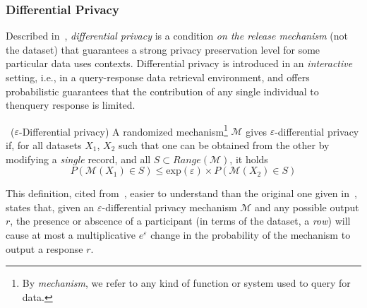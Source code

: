 \subsubsection{Differential Privacy}

Described in~\citet{Dwork:DifferentialPrivacy}, \textit{differential privacy} is a condition \textit{on the release mechanism} (not the dataset) that guarantees a strong privacy preservation level for some particular data uses contexts. Differential privacy is introduced in an \textit{interactive} setting, i.e., in a query-response data retrieval environment, and offers probabilistic guarantees that the contribution of any single individual to thenquery response is limited.

\begin{definition}~($\varepsilon$-Differential privacy)
A randomized mechanism\footnote{By \textit{mechanism}, we refer to any kind of function or system used to query for data.} $\mathcal{M}$ gives $\varepsilon$-differential privacy if, for all datasets $X_1$, $X_2$ such that one can be obtained from the other by modifying a \textit{single} record, and all $S \subset Range(\mathcal{M})$, it holds
\begin{equation}
P(\mathcal{M}(X_1) \in S) \leq \mathrm{exp}(\varepsilon) \times P(\mathcal{M}(X_2) \in S)
\end{equation}
\end{definition}

This definition, cited from~\citet{Domingo:EnhancingDiffPrivMicroaggregation}, easier to understand than the original one given in~\citet{Dwork:DifferentialPrivacy}, states that, given an $\varepsilon$-differential privacy mechanism $\mathcal{M}$ and any possible output $r$, the presence or abscence of a participant (in terms of the dataset, a \textit{row}) will cause at most a multiplicative $e^\varepsilon$ change in the probability of the mechanism to output a response $r$.